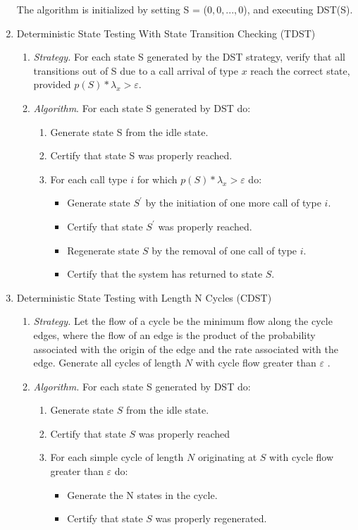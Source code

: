 \documentclass[journal, twoside]{IEEEtran}
\begin{document}
\begin{enumerate}
    The algorithm is initialized by setting S = ($0, 0, . . . , 0$), and executing DST(S). 
    \item Deterministic State Testing With State Transition Checking (TDST)
    \begin{enumerate}
        \item \textit{Strategy.} For each state S generated by the DST strategy, verify that all transitions out of S due to a call arrival of type $x$ reach the correct state, provided $p(S) * \lambda_x >\varepsilon$. 
        \item \textit{Algorithm}. For each state S generated by DST do: 
        \begin{enumerate}
            \item  Generate state S from the idle state. 
            \item Certify that state S was properly reached.
            \item  For each call type $i$ for which $p(S) * \lambda_x >\varepsilon$ do:
            \begin{itemize}
                \item  Generate state $S^'$ by the initiation of one more call of type $i$. 
                \item Certify that state $S^'$ was properly reached.
                \item Regenerate state $S$ by the removal of one call of type $i$. 
                \item Certify that the system has returned to state $S$.
            \end{itemize}
        \end{enumerate}
    \end{enumerate}
    \item Deterministic State Testing with Length N Cycles (CDST)
    \begin{enumerate}
        \item \textit{Strategy. }Let the flow of a cycle be the minimum flow along the cycle edges, where the flow of an edge is the product of the probability associated with the origin of the edge and the rate associated with the edge. Generate all cycles of length $N$ with cycle flow greater than $\varepsilon$ .
        \item \textit{Algorithm.} For each state S generated by DST do: 
        \begin{enumerate}
            \item Generate state $S$ from the idle state.
            \item Certify that state $S$ was properly reached
            \item  For each simple cycle of length $N$ originating at $S$ with cycle flow greater than $\varepsilon$ do: 
            \begin{itemize}
                \item  Generate the N states in the cycle.
                \item  Certify that state $S$ was properly regenerated. 
            \end{itemize}
        \end{enumerate}
    \end{enumerate}
\end{enumerate}
\end{document}

